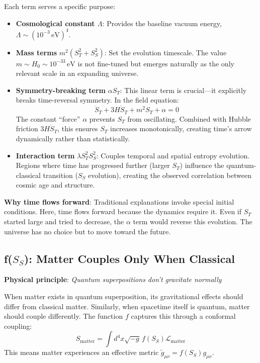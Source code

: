 \documentclass[12pt]{article}
\begin{document}
Each term serves a specific purpose:
\begin{itemize}
    \item \textbf{Cosmological constant $\Lambda$}: Provides the baseline vacuum energy, $\Lambda \sim (10^{-3}\,\mathrm{eV})^4$.
    \item \textbf{Mass terms} $m^2(S_T^2 + S_S^2)$: Set the evolution timescale. The value $m \sim H_0 \sim 10^{-33}\,\mathrm{eV}$ is not fine-tuned but emerges naturally as the only relevant scale in an expanding universe.
    \item \textbf{Symmetry-breaking term} $\alpha S_T$: This linear term is crucial—it explicitly breaks time-reversal symmetry. In the field equation:
    \begin{equation}
        \ddot{S}_T + 3H\dot{S}_T + m^2 S_T + \alpha = 0
    \end{equation}
    The constant ``force'' $\alpha$ prevents $S_T$ from oscillating. Combined with Hubble friction $3H\dot{S}_T$, this ensures $S_T$ increases monotonically, creating time's arrow dynamically rather than statistically.
    \item \textbf{Interaction term} $\lambda S_T^2 S_S^2$: Couples temporal and spatial entropy evolution. Regions where time has progressed further (larger $S_T$) influence the quantum-classical transition ($S_S$ evolution), creating the observed correlation between cosmic age and structure.
\end{itemize}

\textbf{Why time flows forward}: Traditional explanations invoke special initial conditions. Here, time flows forward because the dynamics require it. Even if $S_T$ started large and tried to decrease, the $\alpha$ term would reverse this evolution. The universe has no choice but to move toward the future.

\subsection{f($S_S$): Matter Couples Only When Classical}

\textbf{Physical principle}: \emph{Quantum superpositions don't gravitate normally}

When matter exists in quantum superposition, its gravitational effects should differ from classical matter. Similarly, when spacetime itself is quantum, matter should couple differently. The function $f$ captures this through a conformal coupling:
\begin{equation}
    S_\mathrm{matter} = \int d^4x \sqrt{-g} \, f(S_S)\mathcal{L}_\mathrm{matter}
\end{equation}
This means matter experiences an effective metric $\tilde{g}_{\mu\nu} = f(S_S) g_{\mu\nu}$.
\end{document}
